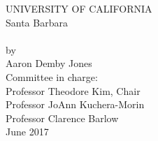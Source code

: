 \thispagestyle{empty}
\begin{center}
  UNIVERSITY OF CALIFORNIA\\
  Santa Barbara\\
  \vfil
  {\Large\thetitle}\\
  \vfil
  by\\
  \vfil
  {\large Aaron Demby Jones}\\
  \vfil
  Committee in charge:\\
  Professor Theodore Kim, Chair\\
  Professor JoAnn Kuchera-Morin\\
  Professor Clarence Barlow\\
  \vfil
  June 2017
\end{center}
